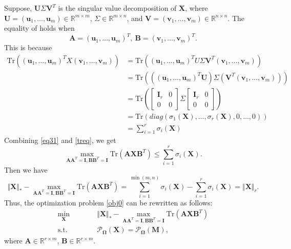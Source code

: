 \documentclass{article}
\begin{document}
{Suppose, $\mathbf U\mathbf \varSigma\mathbf V^T$ is the singular value decomposition of $\mathbf X$, where $\mathbf U = (\bm u_1,\dots,\bm u_m) \in \mathbb{R}^{m \times m}$, $\Sigma \in \mathbb{R}^{m \times n}$, and $\mathbf V = (\bm v_1,\dots,\bm v_m) \in \mathbb{R}^{n \times n}$. The equality of holds when 
\begin{equation}
    \mathbf A = (\bm u_1,\dots,\bm u_m)^T, \ \mathbf B = (\bm v_1,\dots,\bm v_m)^T.
    \label{}
\end{equation}
This is because
\begin{equation}
    \begin{aligned}
        \text{Tr} ((\bm u_1,\dots,\bm u_m)^TX(\bm v_1,\dots,\bm v_m))
        & = \text{Tr} ((\bm u_1,\dots,\bm u_m)^TU\mathbf \varSigma\mathbf V^T(\bm v_1,\dots,\bm v_m)) \\
        & = \text{Tr} (((\bm u_1,\dots,\bm u_m)^T\mathbf U) \mathbf \varSigma (\mathbf V^T(\bm v_1,\dots,\bm v_m))) \\
        & = \text{Tr} \left( \begin{bmatrix}
            \mathbf I_r & 0\\
            0 & 0 
        \end{bmatrix} \Sigma \begin{bmatrix}
            \mathbf I_r & 0\\
            0 & 0 
        \end{bmatrix}
        \right) \\
        & = \text{Tr}(diag(\sigma_1(\mathbf X),\dots,\sigma_r(\mathbf X),0,\dots,0)) \\
        & = \sum_{i=1}^r \sigma_i(\mathbf X)	
    \end{aligned}
    \label{treq}
\end{equation}
Combining \eqref{eq31} and \eqref{treq}, we get
\begin{equation}
    \underset{\mathbf A\mathbf A^T=\mathbf I,\mathbf B\mathbf B^T=\mathbf I}{\max} \text{Tr}(\mathbf A\mathbf X\mathbf B^T) \leq \sum_{i=1}^r \sigma_i(\mathbf X).
\end{equation}
Then we have 
\begin{equation}
    \Vert\mathbf X \Vert_* - \underset{\mathbf A\mathbf A^T=\mathbf I,\mathbf B\mathbf B^T=\mathbf I}{\max} \text{Tr}(\mathbf A\mathbf X\mathbf B^T)  
        = \sum_{i=1}^{\min(m,n)} \sigma_i(\mathbf X) - \sum_{i=1}^r \sigma_i(\mathbf X) 
        = \Vert\mathbf X \Vert_r.
\end{equation}
Thus, the optimization problem \eqref{obj0} can be rewritten as follows:
\begin{equation}
\begin{aligned}
    \min_{\mathbf X}\qquad&\quad  \Vert\mathbf X \Vert_* - \underset{\mathbf A\mathbf A^T=\mathbf I,\mathbf B\mathbf B^T=\mathbf I}{\max} \text{Tr}(\mathbf A\mathbf X\mathbf B^T) \\
    \text{s.t.}\qquad&\quad  \mathcal{P}_{\mathbf\Omega}(\mathbf X) =  \mathcal{P}_{\mathbf\Omega}(\mathbf M),
\end{aligned}\label{obj1}
\end{equation}
where $\mathbf A \in \mathbb{R}^{r \times m}$, $\mathbf B \in \mathbb{R}^{r \times m}$.

}
\end{document}
